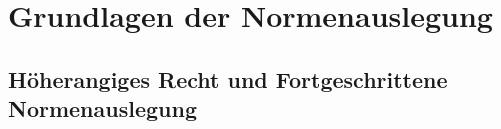 
\chapter{Grundlagen der Normenauslegung}
\blindtext[1]
\section{Höherangiges Recht und Fortgeschrittene Normenauslegung}
\blindtext[5]

\chapterbib
